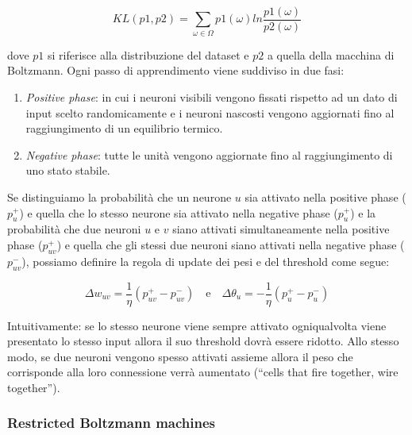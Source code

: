 \documentclass[10pt,a4paper]{article}
\begin{document}
$$
KL(p1,p2) = \sum_{\omega \in \Omega} p1(\omega) ln\frac{p1(\omega)}{p2(\omega)}
$$ 

dove $p1$ si riferisce alla distribuzione del dataset e $p2$ a quella della macchina di Boltzmann. Ogni passo di apprendimento viene suddiviso in due fasi:

\begin{enumerate}
\item{\emph{Positive phase}: in cui i neuroni visibili vengono fissati rispetto ad un dato di input scelto randomicamente e i neuroni nascosti vengono aggiornati fino al raggiungimento di un equilibrio termico.}
\item{\emph{Negative phase}: tutte le unità vengono aggiornate fino al raggiungimento di uno stato stabile.}
\end{enumerate}

Se distinguiamo la probabilità che un neurone $u$ sia attivato nella positive phase ($p_u^{+}$) e quella che lo stesso neurone sia attivato nella negative phase ($p_u^{+}$) e la probabilità che due neuroni $u$ e $v$ siano attivati simultaneamente nella positive phase ($p_{uv}^{+}$) e quella che gli stessi due neuroni siano attivati nella negative phase ($p_{uv}^{-}$), possiamo definire la regola di update dei pesi e del threshold come segue:

$$
\Delta w_{uv} = \frac{1}{\eta} (p_{uv}^{+} - p_{uv}^{-}) 
\quad
\text{e}
\quad
\Delta \theta_u = -\frac{1}{\eta}(p_u^{+} - p_u^{-})
$$
 
Intuitivamente: se lo stesso neurone viene sempre attivato ogniqualvolta viene presentato lo stesso input allora il suo threshold dovrà essere ridotto. Allo stesso modo, se due neuroni vengono spesso attivati assieme allora il peso che corrisponde alla loro connessione verrà aumentato (“cells that fire together, wire together”).

\subsubsection{Restricted Boltzmann machines}
\end{document}
